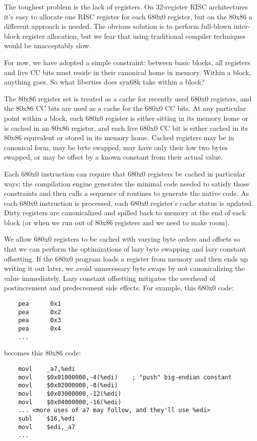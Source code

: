 The toughest problem is the lack of registers.  On 32-register RISC
architectures it's easy to allocate one RISC register for each
680x0 register, but on the 80x86 a different approach is needed.
The obvious solution is to perform full-blown inter-block register
allocation, but we fear that using traditional compiler techniques
would be unacceptably slow.

For now, we have adopted a simple constraint: between basic blocks,
all registers and live CC bits must reside in their canonical home
in memory.  Within a block, anything goes.  So what liberties does
syn68k take within a block?

The 80x86 register set is treated as a cache for recently used
680x0 registers, and the 80x86 CC bits are used as a cache for the
680x0 CC bits.  At any particular point within a block, each 680x0
register is either sitting in its memory home or is cached in an
80x86 register, and each live 680x0 CC bit is either cached in its
80x86 equivalent or stored in its memory home.  Cached registers
may be in canonical form, may be byte swapped, may have only their
low two bytes swapped, or may be offset by a known constant from
their actual value.

Each 680x0 instruction can require that 680x0 registers be cached
in particular ways; the compilation engine generates the minimal
code needed to satisfy those constraints and then calls a sequence
of routines to generate the native code.  As each 680x0 instruction
is processed, each 680x0 register's cache status is updated.  Dirty
registers are canonicalized and spilled back to memory at the end
of each block (or when we run out of 80x86 registers and we need
to make room).

We allow 680x0 registers to be cached with varying byte orders and
offsets so that we can perform the optimizations of lazy byte
swapping and lazy constant offsetting.  If the 680x0 program loads
a register from memory and then ends up writing it out later, we
avoid unnecessary byte swaps by not canonicalizing the value
immediately.  Lazy constant offsetting mitigates the overhead of
postincrement and predecrement side effects.  For example, this
680x0 code:

\begin{verbatim}
	pea      0x1
	pea      0x2
	pea      0x3
	pea      0x4
	...
\end{verbatim}

becomes this 80x86 code:

\begin{verbatim}
	movl    _a7,%edi
	movl    $0x01000000,-4(%edi)    ; "push" big-endian constant
	movl    $0x02000000,-8(%edi)
	movl    $0x03000000,-12(%edi)
	movl    $0x04000000,-16(%edi)
	... <more uses of a7 may follow, and they'll use %edi>
	subl    $16,%edi
	movl    $edi,_a7
	...
\end{verbatim}

